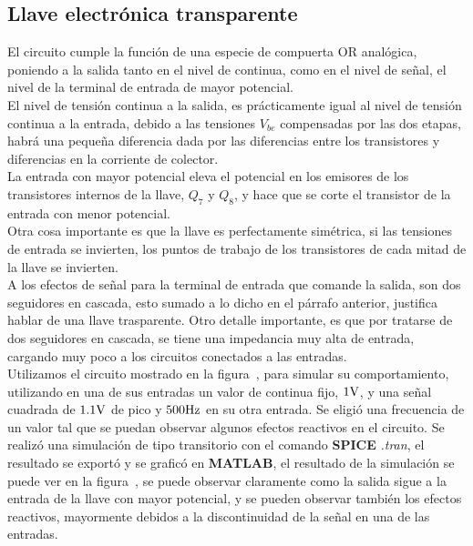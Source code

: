
\subsection{Llave electrónica transparente}

\label{section:switch}

El circuito cumple la función de una especie de compuerta OR analógica, poniendo a la salida tanto en el nivel de continua, como en el nivel de señal, el nivel de la terminal de entrada de mayor potencial.\\ 
El nivel de tensión continua a la salida, es prácticamente igual al nivel de tensión continua a la entrada, debido a las tensiones $V_{be}$ compensadas por las dos etapas, habrá una pequeña diferencia dada por las diferencias entre los transistores y diferencias en la corriente de colector.\\
La entrada con mayor potencial eleva el potencial en los emisores de los transistores internos de la llave, $Q_{7}$ y $Q_{8}$, y hace que se corte el transistor de la entrada con menor potencial. \\
Otra cosa importante es que la llave es perfectamente simétrica, si las tensiones de entrada se invierten, los puntos de trabajo de los transistores de cada mitad de la llave se invierten.\\
A los efectos de señal para la terminal de entrada que comande la salida, son dos seguidores en cascada, esto sumado a lo dicho en el párrafo anterior, justifica hablar de una llave trasparente. Otro detalle importante, es que por tratarse de dos seguidores en cascada, se tiene una impedancia muy alta de entrada, cargando muy poco a los circuitos conectados a las entradas.\\
Utilizamos el circuito mostrado en la figura~, para simular su comportamiento, utilizando en una de sus entradas un valor de continua fijo, $1 \si[per-mode=symbol]{\volt}$, y una señal cuadrada de $1.1 \si[per-mode=symbol]{\volt}$ de pico y $500 \si[per-mode=symbol]{\hertz}$ en su otra entrada. Se eligió una frecuencia de un valor tal que se puedan observar algunos efectos reactivos en el circuito. Se realizó una simulación de tipo transitorio con el comando \textbf{SPICE} \textit{.tran}, el resultado se exportó y se graficó en \textbf{MATLAB}, el resultado de la simulación se puede ver en la figura~, se puede observar claramente como la salida sigue a la entrada de la llave con mayor potencial, y se pueden observar también los efectos reactivos, mayormente debidos a la discontinuidad de la señal en una de las entradas.\\
